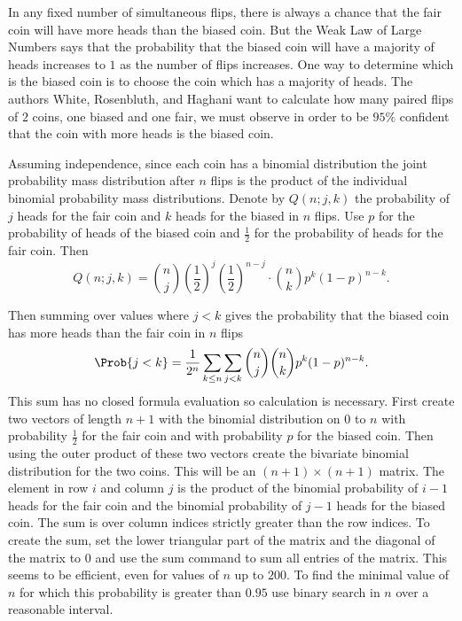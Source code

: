 \documentclass[12pt]{article}
\begin{document}

In any fixed number of simultaneous flips, there is always a chance that
the fair coin will have more heads than the biased coin.  But the Weak
Law of Large Numbers says that the probability that the biased coin will
have a majority of heads increases to \( 1 \) as the number of flips
increases.  One way to determine which is the biased coin is to choose
the coin which has a majority of heads.  The authors White, Rosenbluth,
and Haghani want to calculate how many paired flips of \( 2 \) coins,
one biased and one fair, we must observe in order to be \( 95\% \)
confident that the coin with more heads is the biased coin.

Assuming independence, since each coin has a binomial distribution the
joint probability mass distribution after \( n \) flips is the product
of the individual binomial probability mass distributions.%
Denote by \( Q(n; j,k) \) the probability of \( j \) heads for the fair
coin and \( k \) heads for the biased in \( n \) flips.  Use \( p \) for
the probability of heads of the biased coin and \( \frac{1}{2} \) for
the probability of heads for the fair coin.  Then
\[
    Q( n; j, k) = \binom{n}{j} \left( \frac{1}{2} \right)^j \left( \frac
    {1}{2} \right)^{n-j} \cdot \binom{n}{k} p^k (1-p)^{n-k}.
\]%

Then summing over values where \( j < k \) gives the probability that
the biased coin has more heads than the fair coin in \( n \) flips
\[
    \Prob{j<k} = \frac{1}{2^{n}} \sum\limits_{k \le n} \sum\limits_{j <
    k } \binom{n}{j} \binom{n}{k} p^k (1-p)^{n-k}.
\] This sum has no closed formula evaluation so calculation is
necessary.  First create two vectors of length \( n+1 \) with the
binomial distribution on \( 0 \) to \( n \) with probability \( \frac{1}
{2} \) for the fair coin and with probability \( p \) for the biased
coin.  Then using the outer product of these two vectors create the
bivariate binomial distribution for the two coins.  This will be an \( (n+1)
\times (n+1) \) matrix.  The element in row \( i \) and column \( j \)
is the product of the binomial probability of \( i-1 \) heads for the
fair coin and the binomial probability of \( j-1 \) heads for the biased
coin.  The sum is over column indices strictly greater than the row
indices.  To create the sum, set the lower triangular part of the matrix
and the diagonal of the matrix to \( 0 \) and use the sum command to sum
all entries of the matrix.  This seems to be efficient, even for values
of \( n \) up to \( 200 \).  To find the minimal value of \( n \) for
which this probability is greater than \( 0.95 \) use binary search in \(
n \) over a reasonable interval.
\end{document}
